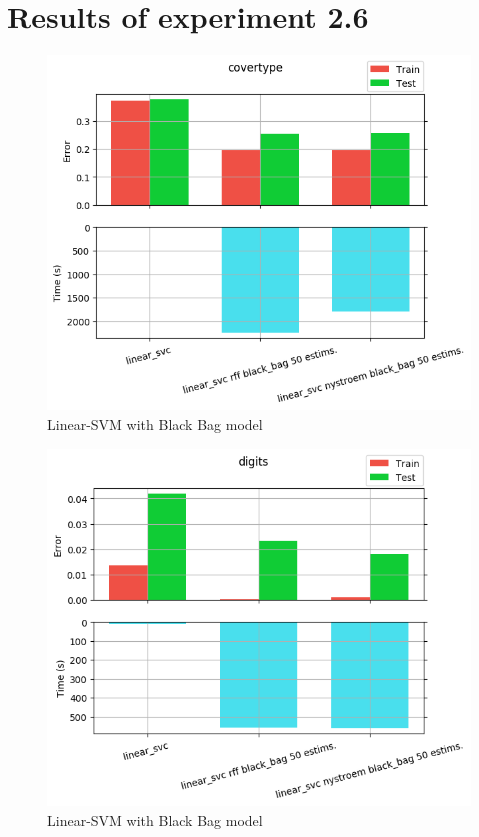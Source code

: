 
\chapter{Results of experiment 2.6} %

\label{Appendix2-6} %

\begin{figure}[th]
\centering
\includegraphics[scale=\imgscale]{Figures/2_6/covertype}
\decoRule
\caption[2.6 covertype]{Linear-SVM with Black Bag model}
\label{fig:2_6_covertype}
\end{figure}

\begin{figure}[th]
\centering
\includegraphics[scale=\imgscale]{Figures/2_6/digits}
\decoRule
\caption[2.6 digits]{Linear-SVM with Black Bag model}
\label{fig:2_6_digits}
\end{figure}

